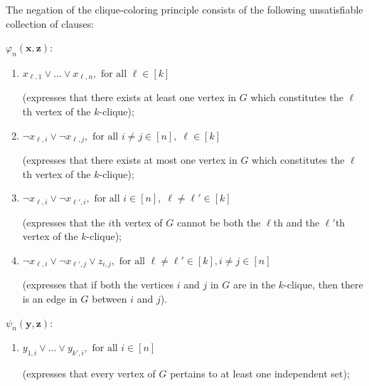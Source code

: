 \begin{definition}\label{def-clique-color}
The negation of the clique-coloring principle consists of the following
unsatisfiable collection of clauses:

$\varphi_n(\mathbf{x,z})$:
\renewcommand{\theenumi}{\roman{enumi}}   %
\begin{enumerate}
\item $x_{\ell,1}\lor\dots\lor x_{\ell,n}, \mbox{ for all } \ell\in[k]$

(expresses that there exists at least one vertex in $G$ which constitutes
the $\ell$th vertex of the $k$-clique); \label{eq-clique-q-pigeons}%

\item $\neg x_{\ell,i}\lor \neg x_{\ell,j},  \mbox{ for all } i\ne j \in [n],\;
          \ell\in[k]$

(expresses that there exists at most one vertex in $G$ which constitutes
the $\ell$th vertex of the $k$-clique); \label{eq-clique-functional-q}%

\item $\neg x_{\ell,i}\lor \neg x_{\ell',i}, \mbox{ for all } i\in [n],\;
          \ell\ne \ell'\in[k]$

(expresses that the $i$th vertex of $G$ cannot be both the $\ell$th
and the $\ell'$th vertex of the $k$-clique);\label{eq-clique-holes-q}%

\item $\neg x_{\ell,i}\lor \neg x_{\ell',j}\lor z_{i,j}, \mbox{ for all }
\ell\ne\ell'\in[k], i\ne j\in[n]$

(expresses that if both the vertices $i$ and $j$ in $G$ are in the $k$-clique,
then there is an edge in $G$ between $i$ and $j$).
\label{eq-clique-p-and-q-vars}%
\end{enumerate}

$\psi_n(\mathbf{y},\mathbf{z})$:

\begin{enumerate}


\item $y_{1,i}\vee \dots \vee y_{k',i}, \mbox{ for all } i\in[n]$

(expresses that every vertex of $G$ pertains to at least one independent set);
\label{eq-clique-r-pigeons}%


\end{enumerate}
\end{definition}
